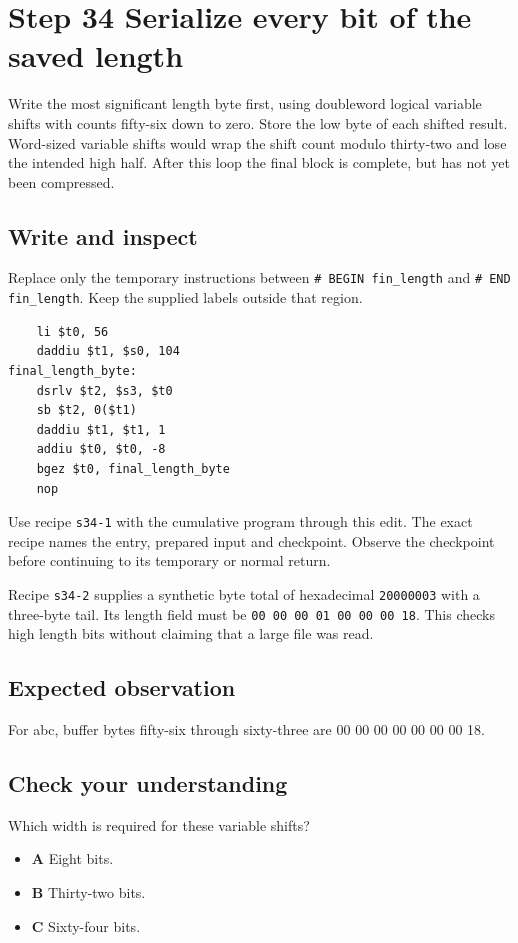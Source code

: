 \section{Step 34 Serialize every bit of the saved length}\label{sha-s34}

Write the most significant length byte first, using doubleword logical variable shifts with counts fifty-six down to zero. Store the low byte of each shifted result. Word-sized variable shifts would wrap the shift count modulo thirty-two and lose the intended high half. After this loop the final block is complete, but has not yet been compressed.

\subsection{Write and inspect}
Replace only the temporary instructions between \texttt{\# BEGIN fin\_length} and \texttt{\# END fin\_length}. Keep the supplied labels outside that region.

\begin{verbatim}
    li $t0, 56
    daddiu $t1, $s0, 104
final_length_byte:
    dsrlv $t2, $s3, $t0
    sb $t2, 0($t1)
    daddiu $t1, $t1, 1
    addiu $t0, $t0, -8
    bgez $t0, final_length_byte
    nop
\end{verbatim}

Use recipe \texttt{s34-1} with the cumulative program through this edit. The exact recipe names the entry, prepared input and checkpoint. Observe the checkpoint before continuing to its temporary or normal return.

Recipe \texttt{s34-2} supplies a synthetic byte total of hexadecimal \texttt{20000003} with a three-byte tail. Its length field must be \texttt{00 00 00 01 00 00 00 18}. This checks high length bits without claiming that a large file was read.

\subsection{Expected observation}
For abc, buffer bytes fifty-six through sixty-three are 00 00 00 00 00 00 00 18.

\subsection{Check your understanding}
Which width is required for these variable shifts?

\begin{itemize}
  \item \textbf{A} Eight bits.
  \item \textbf{B} Thirty-two bits.
  \item \textbf{C} Sixty-four bits.
\end{itemize}
